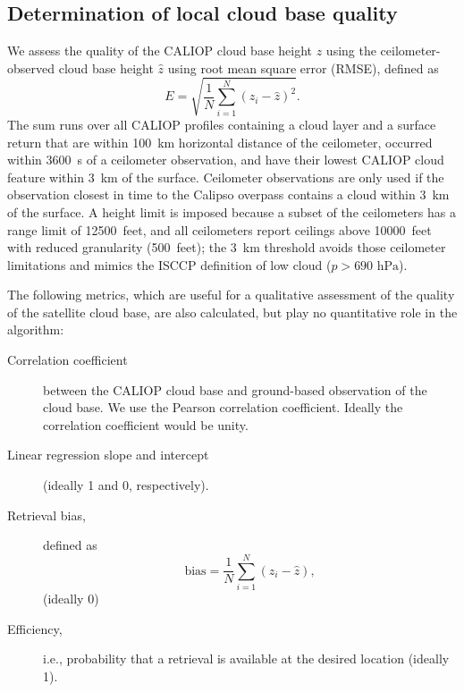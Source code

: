 \documentclass[amt,manuscript]{copernicus}\usepackage[]{graphicx}\usepackage[]{color}
\begin{document}
\subsection{Determination of local cloud base quality}
\label{sec:algorithm:qual}
We assess the quality of the CALIOP cloud base height $z$ using the
ceilometer-observed cloud base height $\hat{z}$ using root mean square error
(RMSE), defined as
\begin{equation}
  \label{eq:rmse}
  E = \sqrt{\frac{1}{N}\sum\limits_{i = 1}^{N}\left(z_i - \hat{z}\right)^2}.
\end{equation}
The sum runs over all CALIOP profiles containing a cloud layer and a surface
return that are within 100~km horizontal distance of the ceilometer, occurred
within 3600~s of a ceilometer observation, and have their lowest CALIOP cloud
feature within 3~km of the surface.  Ceilometer observations are only used if
the observation closest in time to the Calipso overpass contains a cloud within
3~km of the surface.  A height limit is imposed because a subset of the
ceilometers has a range limit of 12500~feet, and all ceilometers report ceilings
above 10000~feet with reduced granularity (500~feet); the 3~km threshold avoids
those ceilometer limitations and mimics the ISCCP definition of low cloud
($p > 690\text{ hPa}$).

The following metrics, which are useful for a qualitative assessment of the
quality of the satellite cloud base, are also calculated, but play no
quantitative role in the algorithm:
\begin{description}
\item[Correlation coefficient] between the CALIOP cloud base and ground-based
  observation of the cloud base.  We use the Pearson correlation coefficient.
  Ideally the correlation coefficient would be unity.  
\item[Linear regression slope and intercept] (ideally 1 and 0, respectively).  
\item[Retrieval bias,] defined as
  \begin{equation}
    \label{eq:bias}
    \mbox{bias} = \frac{1}{N}\sum\limits_{i = 1}^{N}\left(z_i - \hat{z}\right),
  \end{equation}(ideally 0)
\item[Efficiency,] i.e., probability that a retrieval is available at the
  desired location (ideally 1).
\end{description}
\end{document}
